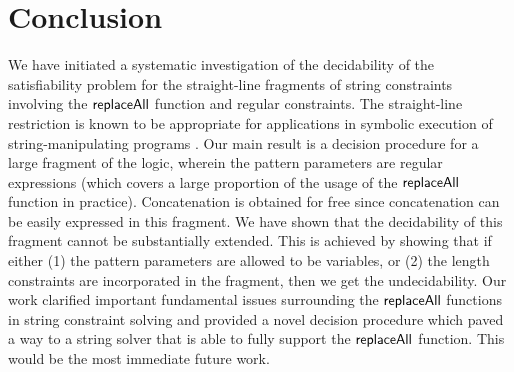 
\section{Conclusion}

We have initiated a systematic investigation of the decidability of 
the satisfiability problem for the straight-line fragments of string 
constraints involving the $\mathsf{replaceAll}$ function and regular constraints.
The straight-line restriction is known to be appropriate for applications in symbolic execution 
of 
string-manipulating programs \cite{LB16}. Our main result is a decision 
procedure for a large fragment of the logic, wherein the pattern parameters are
regular expressions (which covers a large proportion of the usage of the 
$\mathsf{replaceAll}$ function in practice). Concatenation is obtained for free since concatenation can be easily expressed in this fragment.
We have shown that the decidability
of this fragment cannot be substantially extended. This is achieved by showing
that if either (1) the pattern parameters are allowed to be variables, or (2) the length
constraints are incorporated in the fragment, then we get the undecidability.
Our work clarified important fundamental issues surrounding the $\mathsf{replaceAll}$
functions in string constraint solving and provided a novel decision procedure
which paved a way to a string solver that is able to fully support the
$\mathsf{replaceAll}$ function. This would be the most immediate future work. 
